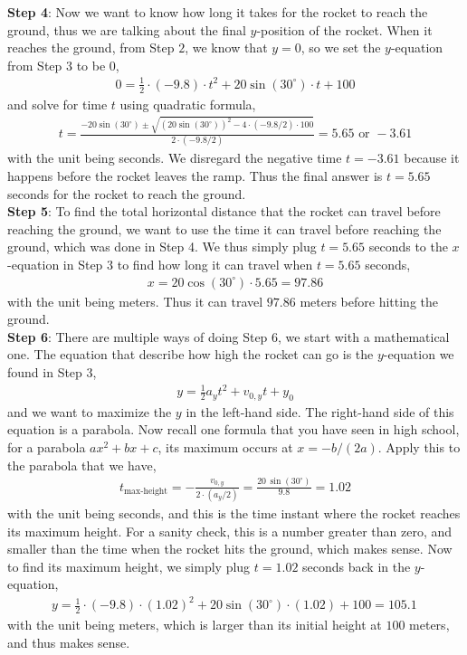\documentclass[11pt]{article}
\begin{document}
\textbf{Step 4}:
Now we want to know how long it takes for the rocket to reach the ground, thus we are talking about the final $y$-position of the rocket. When it reaches the ground, from Step $2$, we know that $y = 0$, so we set the $y$-equation from Step 3 to be $0$, 
\begin{align*}
0= \frac{1}{2}\cdot (-9.8) \cdot t^2 + 20\sin(30^\circ)\cdot t + 100
\end{align*}
and solve for time $t$ using quadratic formula, 
\begin{align*}
t = \frac{-20\sin(30^\circ)\pm \sqrt{(20\sin(30^\circ))^2 - 4\cdot (-9.8/2)\cdot 100}}{2\cdot (-9.8/2)} =5.65 \text{ or } -3.61
\end{align*}
with the unit being seconds. We disregard the negative time $t=-3.61$ because it happens before the rocket leaves the ramp. Thus the final answer is $t= 5.65$ seconds for the rocket to reach the ground.\\

\textbf{Step 5}: 
To find the total horizontal distance that the rocket can travel before reaching the ground, we want to use the time it can travel before reaching the ground, which was done in Step 4. We thus simply plug $t = 5.65$ seconds to the $x$-equation in Step 3 to find how long it can travel when $t = 5.65$ seconds, 
\begin{align*}
x = 20 \cos(30^\circ) \cdot 5.65  = 97.86
\end{align*}
with the unit being meters. Thus it can travel $97.86$ meters before hitting the ground.\\

\textbf{Step 6}: There are multiple ways of doing Step 6, we start with a mathematical one. The equation that describe how high the rocket can go is the $y$-equation we found in Step 3,
\begin{align*}
y = \frac{1}{2}a_y t^2 + v_{0,y} t + y_0
\end{align*}
and we want to maximize the $y$ in the left-hand side. The right-hand side of this equation is a parabola. Now recall one formula that you have seen in high school, for a parabola $ax^2 + bx+c$, its maximum occurs at $x = -b/(2a)$. Apply this to the parabola that we have, 
\begin{align*}
t_{\text{max-height}} = -\frac{v_{0,y}}{2\cdot (a_y/2)} = \frac{20\,\sin(30^\circ)}{9.8} = 1.02
\end{align*}
with the unit being seconds, and this is the time instant where the rocket reaches its maximum height. For a sanity check, this is a number greater than zero, and smaller than the time when the rocket hits the ground, which makes sense. Now to find its maximum height, we simply plug $t = 1.02$ seconds back in the $y$-equation, 
\begin{align*}
y =  \frac{1}{2}\cdot (-9.8) \cdot (1.02)^2 + 20\sin(30^\circ)\cdot (1.02) + 100 = 105.1\,
\end{align*}
with the unit being meters, which is larger than its initial height at $100$ meters, and thus makes sense.\\
\end{document}
